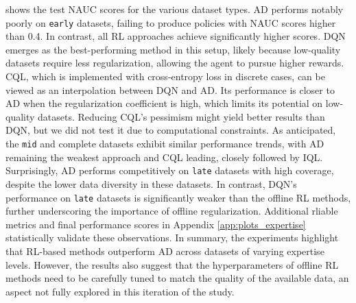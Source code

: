 \documentclass{article}
\begin{document}
 shows the test NAUC scores for the various dataset types. AD performs notably poorly on \texttt{early} datasets, failing to produce policies with NAUC scores higher than 0.4. In contrast, all RL approaches achieve significantly higher scores. DQN emerges as the best-performing method in this setup, likely because low-quality datasets require less regularization, allowing the agent to pursue higher rewards. CQL, which is implemented with cross-entropy loss in discrete cases, can be viewed as an interpolation between DQN and AD. Its performance is closer to AD when the regularization coefficient is high, which limits its potential on low-quality datasets. Reducing CQL's pessimism might yield better results than DQN, but we did not test it due to computational constraints.
As anticipated, the \texttt{mid} and complete datasets exhibit similar performance trends, with AD remaining the weakest approach and CQL leading, closely followed by IQL. Surprisingly, AD performs competitively on \texttt{late} datasets with high coverage, despite the lower data diversity in these datasets. In contrast, DQN's performance on \texttt{late} datasets is significantly weaker than the offline RL methods, further underscoring the importance of offline regularization. Additional rliable metrics and final performance scores in Appendix \ref{app:plots_expertise} statistically validate these observations.
In summary, the experiments highlight that RL-based methods outperform AD across datasets of varying expertise levels. However, the results also suggest that the hyperparameters of offline RL methods need to be carefully tuned to match the quality of the available data, an aspect not fully explored in this iteration of the study.
\end{document}
